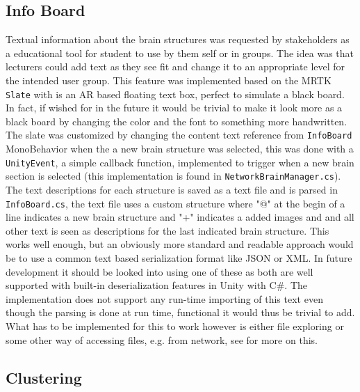 \subsection{Info Board}
Textual information about the brain structures was requested by stakeholders as a educational tool for student to use by them self or in groups. The idea was that lecturers could add text as they see fit and change it to an appropriate level for the intended user group. 
This feature was implemented based on the MRTK \texttt{Slate} with is an AR based floating text box, perfect to simulate a black board. In fact, if wished for in the future it would be trivial to make it look more as a black board by changing the color and the font to something more handwritten.
The slate was customized by changing the content text reference from \texttt{InfoBoard} MonoBehavior when the a new brain structure was selected, this was done with a \texttt{UnityEvent}, a simple callback function, implemented to trigger when a new brain section is selected (this implementation
 is found in \texttt{NetworkBrainManager.cs}). The text descriptions for each structure is saved as a text file and is parsed in \texttt{InfoBoard.cs}, the text file uses a custom structure where "@" at the begin of a line indicates a new brain structure and "+" indicates a added images and and all other text is seen as descriptions for the last indicated brain structure. This works well enough, but an obviously more standard and readable approach would be to use a common text based serialization format like JSON or XML. In future development it should be looked into using one of these as both are well supported with built-in deserialization features in Unity with C\#. The implementation does not support any run-time importing of this text even though the parsing is done at run time, functional it would thus be trivial to add. What has to be implemented for this to work however is either file exploring or some other way of accessing files, e.g. from network, see  for more on this.

\subsection{Clustering}\label{chap:clustering}

